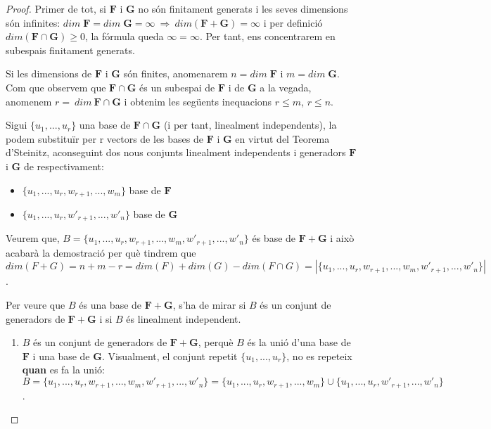 \begin{proof}
Primer de tot, si $\mathbf{F}$ i $\mathbf{G}$ no són finitament generats i les seves dimensions són infinites: $dim\;\mathbf{F} = dim\;\mathbf{G} = \infty \: \Rightarrow \: dim(\mathbf{F}+\mathbf{G}) = \infty$ i per definició $dim(\mathbf{F}\cap\mathbf{G}) \geq 0$, la fórmula queda $\infty = \infty$. Per tant, ens concentrarem en subespais finitament generats.


Si les dimensions de $\mathbf{F}$ i $\mathbf{G}$ són finites, anomenarem $n = dim\;\mathbf{F}$ i $m = dim\;\mathbf{G}$. Com que observem que $\mathbf{F}\cap\mathbf{G}$ és un subespai de $\mathbf{F}$ i de $\mathbf{G}$ a la vegada, anomenem $r = \:dim\:\mathbf{F}\cap\mathbf{G}$ i obtenim les següents inequacions $r \leq m$, $r \leq n$.


Sigui $\{u_1,...,u_r\}$ una base de $\mathbf{F}\cap\mathbf{G}$ (i per tant, linealment independents), la podem substituïr per r vectors de les bases de $\mathbf{F}$ i $\mathbf{G}$ en virtut del Teorema d'Steinitz, aconseguint dos nous conjunts linealment independents i generadors $\mathbf{F}$ i $\mathbf{G}$ de respectivament:
\begin{itemize}
    \item $\{u_1,...,u_r, w_{r+1}, ..., w_m\}$ base de $\mathbf{F}$
    \item $\{u_1,...,u_r,w'_{r+1},...,w'_n\}$ base de $\mathbf{G}$
\end{itemize}    
Veurem que, $B = \{u_1,...,u_r, w_{r+1}, ..., w_m, w'_{r+1},...,w'_n\}$ és base de $\mathbf{F}+\mathbf{G}$ i això acabarà la demostració per què tindrem que $dim(F + G) = n +m- r = dim(F) + dim(G) - dim(F \cap G) = |\{u_1,...,u_r, w_{r+1}, ..., w_m, w'_{r+1},...,w'_n\}|$.


Per veure que $B$ és una base de $\mathbf{F}+\mathbf{G}$, s'ha de mirar si $B$ és un conjunt de generadors de $\mathbf{F}+\mathbf{G}$ i si $B$ és linealment independent.

\begin{enumerate}[(1)]
\item $B$ és un conjunt de generadors de $\mathbf{F}+\mathbf{G}$, perquè $B$ és la unió d'una base de $\mathbf{F}$ i una base de $\mathbf{G}$. Visualment, el conjunt repetit $\{u_1,...,u_r\}$, no es repeteix \textbf{quan} es fa la unió: $B = \{u_1,...,u_r, w_{r+1}, ..., w_m, w'_{r+1},...,w'_n\} = \{u_1,...,u_r, w_{r+1}, ..., w_m\}\cup\{u_1,...,u_r,w'_{r+1},...,w'_n\}$.


\end{enumerate}
\end{proof}
